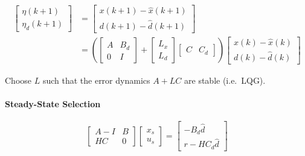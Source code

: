 {\small
    \begin{align*}
        \begin{bmatrix}
            \eta(k + 1) \\
            \eta_d (k+1)
        \end{bmatrix}
         & = \begin{bmatrix}
                 x(k + 1) - \widehat{x}(k + 1) \\
                 d(k + 1) - \widehat{d}(k + 1)
             \end{bmatrix}
        \\
         & =
        \left(
        \begin{bmatrix}
            A & B_d \\
            0 & I
        \end{bmatrix}
        +
        \begin{bmatrix}
            L_x \\
            L_d
        \end{bmatrix}
        \begin{bmatrix}
            C & C_d
        \end{bmatrix}
        \right)
        \begin{bmatrix}
            x(k) - \widehat{x}(k) \\
            d(k) - \widehat{d}(k)
        \end{bmatrix}
    \end{align*}
}

Choose $L$ such that the error dynamics $A+LC$ are stable (i.e.\ LQG).

\paragraph{Steady-State Selection}
\noindent
\begin{equation*}
    \begin{bmatrix}
        A - I & B \\
        HC    & 0
    \end{bmatrix}
    \begin{bmatrix}
        x_s \\
        u_s
    \end{bmatrix}
    =
    \begin{bmatrix}
        - B_d \widehat{d} \\
        r - HC_d \widehat{d}
    \end{bmatrix}
\end{equation*}

